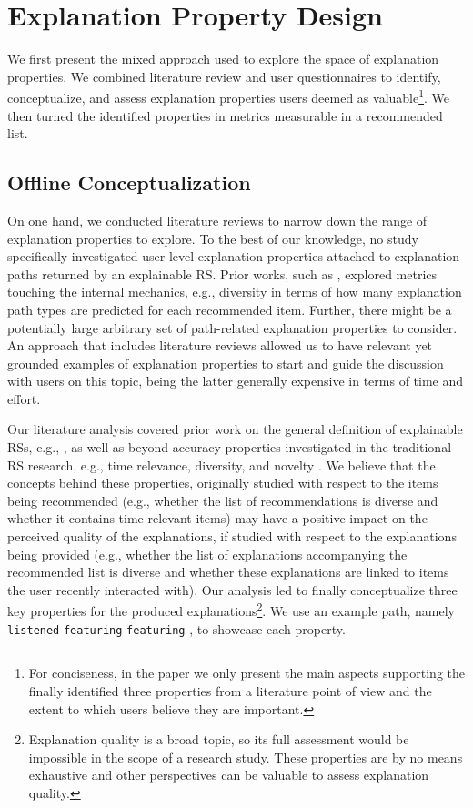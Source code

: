 \documentclass[sigconf]{acmart}
\begin{document}
\section{Explanation Property Design}\label{sec:exp-properties}
We first present the mixed approach used to explore the space of explanation properties. We combined literature review and user questionnaires to identify, conceptualize, and assess explanation properties users deemed as valuable\footnote{For conciseness, in the paper we only present the main aspects supporting the finally identified three properties from a literature point of view and the extent to which users believe they are important.}. We then turned the identified properties in metrics measurable in a recommended list.  

\subsection{Offline Conceptualization}\label{subsec:conceptualization}
On one hand, we conducted literature reviews to narrow down the range of explanation properties to explore. To the best of our knowledge, no study specifically investigated user-level explanation properties attached to explanation paths returned by an explainable RS. Prior works, such as \cite{FuXGZHGXGSZM20}, explored metrics touching the internal mechanics, e.g., diversity in terms of how many explanation path types are predicted for each recommended item. Further, there might be a potentially large arbitrary set of path-related explanation properties to consider. An approach that includes literature reviews allowed us to have relevant yet grounded examples of explanation properties to start and guide the discussion with users on this topic, being the latter generally expensive in terms of time and effort. 

Our literature analysis covered prior work on the general definition of explainable RSs, e.g., \cite{Tintarev2007}, as well as beyond-accuracy properties investigated in the traditional RS research, e.g., time relevance, diversity, and novelty \cite{DBLP:journals/tiis/KaminskasB17}. We believe that the concepts behind these properties, originally studied with respect to the items being recommended (e.g.,  whether the list of recommendations is diverse and whether it contains time-relevant items) may have a positive impact on the perceived quality of the explanations, if studied with respect to the explanations being provided (e.g., whether the list of explanations accompanying the recommended list is diverse and whether these explanations are linked to items the user recently interacted with). Our analysis led to finally conceptualize three key properties for the produced explanations\footnote{
Explanation quality is a broad topic, so its full assessment would be impossible in the scope of a research study. These properties are by no means exhaustive and other perspectives can be valuable to assess explanation quality.}. We use an example path, namely  \texttt{listened}  \texttt{featuring}  \texttt{featuring} , to showcase each property. 
\end{document}
